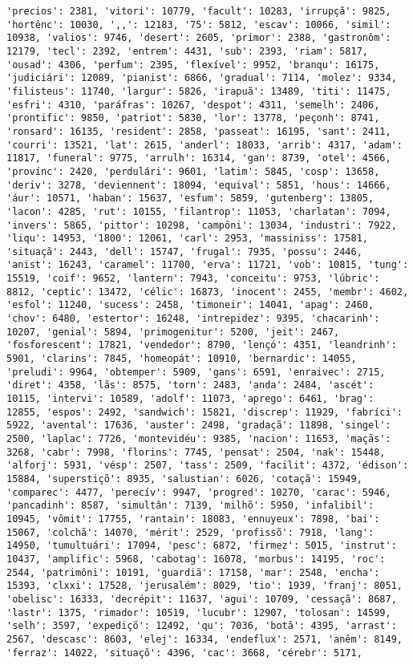 \documentclass[11pt]{article}
\begin{document}
\begin{Verbatim}[commandchars=\\\{\}]
'precios': 2381, 'vitori': 10779, 'facult': 10283, 'irrupçã': 9825, 'hortênc': 10030, ',,': 12183, '75': 5812, 'escav': 10066, 'simil': 10938, 'valios': 9746, 'desert': 2605, 'primor': 2388, 'gastronôm': 12179, 'tecl': 2392, 'entrem': 4431, 'sub': 2393, 'riam': 5817, 'ousad': 4306, 'perfum': 2395, 'flexível': 9952, 'branqu': 16175, 'judiciári': 12089, 'pianist': 6866, 'gradual': 7114, 'molez': 9334, 'filisteus': 11740, 'largur': 5826, 'irapuã': 13489, 'titi': 11475, 'esfri': 4310, 'paráfras': 10267, 'despot': 4311, 'semelh': 2406, 'prontific': 9850, 'patriot': 5830, 'lor': 13778, 'peçonh': 8741, 'ronsard': 16135, 'resident': 2858, 'passeat': 16195, 'sant': 2411, 'courri': 13521, 'lat': 2615, 'anderl': 18033, 'arrib': 4317, 'adam': 11817, 'funeral': 9775, 'arrulh': 16314, 'gan': 8739, 'otel': 4566, 'provínc': 2420, 'perdulári': 9601, 'latim': 5845, 'cosp': 13658, 'deriv': 3278, 'deviennent': 18094, 'equival': 5851, 'hous': 14666, 'áur': 10571, 'haban': 15637, 'esfum': 5859, 'gutenberg': 13805, 'lacon': 4285, 'rut': 10155, 'filantrop': 11053, 'charlatan': 7094, 'invers': 5865, 'pittor': 10298, 'campôni': 13034, 'industri': 7922, 'liqu': 14953, '1800': 12061, 'carl': 2953, 'massiniss': 17581, 'situaçã': 2443, 'dell': 15747, 'frugal': 7935, 'possu': 2446, 'anist': 16243, 'caramel': 11700, 'erva': 11721, 'vob': 10815, 'tung': 15519, 'coif': 9652, 'lantern': 7943, 'conceitu': 9753, 'lúbric': 8812, 'ceptic': 13472, 'célic': 16873, 'inocent': 2455, 'membr': 4602, 'esfol': 11240, 'sucess': 2458, 'timoneir': 14041, 'apag': 2460, 'chov': 6480, 'estertor': 16248, 'intrepidez': 9395, 'chacarinh': 10207, 'genial': 5894, 'primogenitur': 5200, 'jeit': 2467, 'fosforescent': 17821, 'vendedor': 8790, 'lençó': 4351, 'leandrinh': 5901, 'clarins': 7845, 'homeopát': 10910, 'bernardic': 14055, 'preludi': 9964, 'obtemper': 5909, 'gans': 6591, 'enraivec': 2715, 'diret': 4358, 'lãs': 8575, 'torn': 2483, 'anda': 2484, 'ascét': 10115, 'intervi': 10589, 'adolf': 11073, 'aprego': 6461, 'brag': 12855, 'espos': 2492, 'sandwich': 15821, 'discrep': 11929, 'fabríci': 5922, 'avental': 17636, 'auster': 2498, 'gradaçã': 11898, 'singel': 2500, 'laplac': 7726, 'montevidéu': 9385, 'nacion': 11653, 'maçãs': 3268, 'cabr': 7998, 'florins': 7745, 'pensat': 2504, 'nak': 15448, 'alforj': 5931, 'vésp': 2507, 'tass': 2509, 'facilit': 4372, 'édison': 15884, 'superstiçõ': 8935, 'salustian': 6026, 'cotaçã': 15949, 'comparec': 4477, 'perecív': 9947, 'progred': 10270, 'carac': 5946, 'pancadinh': 8587, 'simultân': 7139, 'milhõ': 5950, 'infalibil': 10945, 'vômit': 17755, 'rantain': 18083, 'ennuyeux': 7898, 'bai': 15067, 'colchã': 14070, 'mérit': 2529, 'profissõ': 7918, 'lang': 14950, 'tumultuári': 17094, 'pesc': 6872, 'firmez': 5015, 'instrut': 10437, 'amplific': 5968, 'cabotag': 16078, 'morbus': 14195, 'roc': 2544, 'patrimôni': 10191, 'guardiã': 17158, 'mar': 2548, 'encha': 15393, 'clxxi': 17528, 'jerusalém': 8029, 'tio': 1939, 'franj': 8051, 'obelisc': 16333, 'decrépit': 11637, 'agui': 10709, 'cessaçã': 8687, 'lastr': 1375, 'rimador': 10519, 'lucubr': 12907, 'tolosan': 14599, 'selh': 3597, 'expediçõ': 12492, 'qu': 7036, 'botã': 4395, 'arrast': 2567, 'descasc': 8603, 'elej': 16334, 'endeflux': 2571, 'anêm': 8149, 'ferraz': 14022, 'situaçõ': 4396, 'cac': 3668, 'cérebr': 5171, 
\end{Verbatim}
\end{document}
